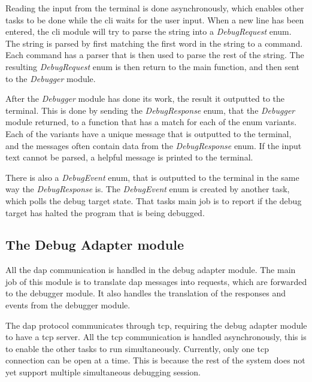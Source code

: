 Reading the input from the terminal is done asynchronously, which enables other tasks to be done while the \acrshort{cli} waits for the user input.
When a new line has been entered, the \acrshort{cli} module will try to parse the string into a \emph{DebugRequest} enum.
The string is parsed by first matching the first word in the string to a command.
Each command has a parser that is then used to parse the rest of the string.
The resulting \emph{DebugRequest} enum is then return to the main function, and then sent to the \emph{Debugger} module.



After the \emph{Debugger} module has done its work, the result it outputted to the terminal.
This is done by sending the \emph{DebugResponse} enum, that the \emph{Debugger} module returned, to a function that has a match for each of the enum variants.
Each of the variants have a unique message that is outputted to the terminal, and the messages often contain data from the \emph{DebugResponse} enum.
If the input text cannot be parsed, a helpful message is printed to the terminal.



There is also a \emph{DebugEvent} enum, that is outputted to the terminal in the same way the \emph{DebugResponse} is.
The \emph{DebugEvent} enum is created by another task, which polls the debug target state.
That tasks main job is to report if the debug target has halted the program that is being debugged.



\subsection{The Debug Adapter module}

All the \gls{dap} communication is handled in the debug adapter module.
The main job of this module is to translate \gls{dap} messages into requests, which are forwarded to the debugger module.
It also handles the translation of the responses and events from the debugger module.


The \gls{dap} protocol communicates through \gls{tcp}, requiring the debug adapter module to have a \gls{tcp} server.
All the \gls{tcp} communication is handled asynchronously, this is to enable the other tasks to run simultaneously.
Currently, only one \gls{tcp} connection can be open at a time.
This is because the rest of the system does not yet support multiple simultaneous debugging session.



